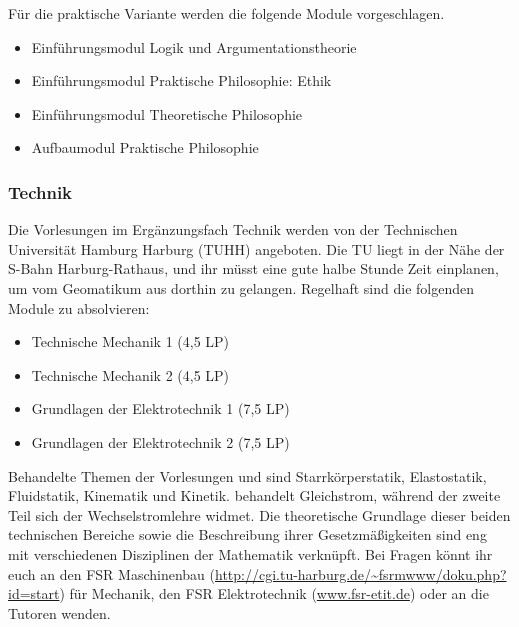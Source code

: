\columnbreak

Für die praktische Variante werden die folgende Module vorgeschlagen.

\begin{itemize}\itemsep 0pt
    \item Einführungsmodul Logik und Argumentationstheorie 
    \item Einführungsmodul Praktische Philosophie: Ethik 
    \item Einführungsmodul Theoretische Philosophie 
    \item Aufbaumodul Praktische Philosophie
\end{itemize}

\subsubsection{Technik}

Die Vorlesungen im Ergänzungsfach Technik werden von der Technischen
Universität Hamburg Harburg (TUHH) angeboten. Die TU liegt in der Nähe der
S-Bahn Harburg-Rathaus, und ihr müsst eine gute halbe Stunde Zeit einplanen, um
vom Geomatikum aus dorthin zu gelangen. Regelhaft sind die folgenden Module zu
absolvieren:

\begin{itemize}\itemsep 0pt
    \item Technische Mechanik 1 (4,5 LP)
    \item Technische Mechanik 2 (4,5 LP)
    \item Grundlagen der Elektrotechnik 1 (7,5 LP)
    \item Grundlagen der Elektrotechnik 2 (7,5 LP)
\end{itemize}

Behandelte Themen der Vorlesungen  und 
sind Starrkörperstatik, Elastostatik, Fluidstatik, Kinematik und Kinetik.
 behandelt Gleichstrom, während der
zweite Teil sich der Wechselstromlehre widmet. Die theoretische Grundlage
dieser beiden technischen Bereiche sowie die Beschreibung ihrer
Gesetzmäßigkeiten sind eng mit verschiedenen Disziplinen der Mathematik
verknüpft. Bei Fragen könnt ihr euch an den FSR Maschinenbau
(\url{http://cgi.tu-harburg.de/~fsrmwww/doku.php?id=start}) für Mechanik, den
FSR Elektrotechnik (\url{www.fsr-etit.de}) oder an die Tutoren wenden.

